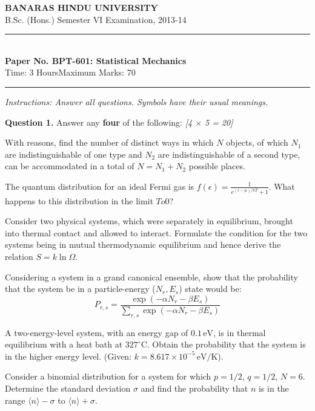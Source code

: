 \documentclass[11pt,a4paper]{article}
\newcommand{\pts}[1]{\hfill   \textit{[#1]}}
\begin{document}
\begin{center}
  {\large\bfseries BANARAS HINDU UNIVERSITY}\\[2pt]
  {\normalsize B.Sc. (Hons.) Semester VI Examination, 2013-14}\\[6pt]
  \rule{0.8\linewidth}{0.5pt}\\[6pt]
  {\large\bfseries Paper No. BPT-601: Statistical Mechanics}\\[4pt]
  {\normalsize Time: 3 Hours\hfill Maximum Marks: 70}
\end{center}
\rule{\linewidth}{0.4pt}
\smallskip



\noindent   \textit{Instructions: Answer all questions. Symbols have their usual meanings.}
\bigskip




\noindent   \textbf{Question 1.} Answer any   \textbf{four} of the following: \pts{4 $ \times$ 5 = 20}

\begin{parts}
  \item With reasons, find the number of distinct ways in which $N$ objects, of which $N_1$ are indistinguishable of one type and $N_2$ are indistinguishable of a second type, can be accommodated in a total of $N = N_1 + N_2$ possible places.
  \item The quantum distribution for an ideal Fermi gas is $f(\epsilon) = \frac{1}{e^{(\epsilon - \mu)/kT} + 1}$. What happens to this distribution in the limit $T  o 0$?
  \item Consider two physical systems, which were separately in equilibrium, brought into thermal contact and allowed to interact. Formulate the condition for the two systems being in mutual thermodynamic equilibrium and hence derive the relation $S = k \ln \Omega$.
  \item Considering a system in a grand canonical ensemble, show that the probability that the system be in a particle-energy ($N_r, E_s$) state would be:
    \[ P_{r,s} = \frac{\exp(-\alpha N_r - \beta E_s)}{\sum_{r,s} \exp(-\alpha N_r - \beta E_s)} \]
  \item A two-energy-level system, with an energy gap of $0.1\, \text{eV}$, is in thermal equilibrium with a heat bath at $327^\circ \text{C}$. Obtain the probability that the system is in the higher energy level. (Given: $k = 8.617  \times 10^{-5}\, \text{eV/K}$).
  \item Consider a binomial distribution for a system for which $p = 1/2$, $q = 1/2$, $N = 6$. Determine the standard deviation $\sigma$ and find the probability that $n$ is in the range $\langle n \rangle - \sigma$ to $\langle n \rangle + \sigma$.
\end{parts}
\end{document}
